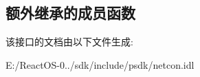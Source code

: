 \subsection*{额外继承的成员函数}


该接口的文档由以下文件生成\+:\begin{DoxyCompactItemize}
\item 
E\+:/\+React\+O\+S-\/0../sdk/include/psdk/netcon.\+idl\end{DoxyCompactItemize}
